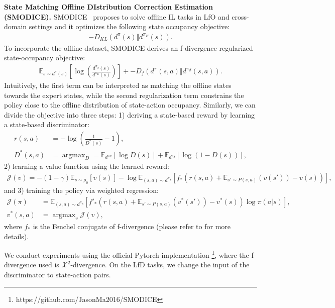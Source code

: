 \textbf{State Matching Offline DIstribution Correction Estimation (SMODICE).} 
SMODICE~\citep{ma2022smodice} proposes to solve offline IL tasks in LfO and cross-domain settings and it optimizes the following state occupancy objective:
\begin{align}
- D_{KL}(d^{\pi}(s) \Vert d^{\pi_E}(s)). \nonumber
\end{align} 
To incorporate the offline dataset, SMODICE derives an f-divergence regularized state-occupancy objective:
\begin{align}
\mathbb{E}_{s \sim d^{\pi}(s)}\left[ \log(\frac{d^{\pi_\beta}(s)}{d^{\pi_E}(s)}) \right] +  - D_{f}(d^{\pi}(s,a) \Vert d^{\pi_\beta}(s,a)). \nonumber
\end{align} 
Intuitively, the first term can be interpreted as matching the offline states towards the expert states, while the second regularization term constrains the policy close to the offline distribution of state-action occupancy. 
Similarly, we can divide the objective into three steps:
1) deriving a state-based reward by learning a state-based discriminator:
\begin{align}
r(s,a) &= -\log(\frac{1}{D^*(s)}-1), \nonumber \\
D^*(s,a) &= \mathop{\arg\max}_D = \mathbb{E}_{d^{\pi_E}} \left[ \log D(s) \right] + \mathbb{E}_{d^{\pi_\beta}} \left[ \log (1-D(s)) \right], \nonumber
\end{align}
2) learning a value function using the learned reward:
\begin{align}
\mathcal{J}(v)=-(1-\gamma) \mathbb{E}_{s \sim \rho_0}\left[ v(s) \right] - \log \mathbb{E}_{(s,a) \sim d^{\pi_\beta}}\left[ f_*(r(s,a)+\mathbb{E}_{s' \sim P(s,a)}(v(s'))-v(s)) \right], \nonumber
\end{align}
and 3) training the policy via weighted regression:
\begin{align}
\mathcal{J}(\pi) &= \mathbb{E}_{(s,a)\sim d^{\pi_\beta}} \left[ f'_*(r(s,a)+\mathbb{E}_{s' \sim P(s,a)}(v^*(s'))-v^*(s)) \log\pi(a \vert s) \right], \nonumber \\
v^*(s,a) &= \mathop{\arg \max}_v \mathcal{J}(v), \nonumber
\end{align} 
where $f_*$ is the Fenchel conjugate of f-divergence (please refer to \citet{ma2022smodice} for more details). 

We conduct experiments using the official Pytorch implementation \footnote{https://github.com/JasonMa2016/SMODICE}, where the f-divergence used is $\mathcal{X}^2$-divergence.
On the LfD tasks, we change the input of the discriminator to state-action pairs. 




